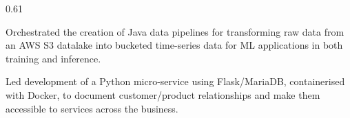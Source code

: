 \documentclass{CV}
\begin{document}
\begin{cvcolumn}{0.61\textwidth}
\vspace{4pt}

\par
{}
\begin{tightemize}
  \item Orchestrated the creation of Java data pipelines for transforming raw data from an AWS S3 datalake into bucketed
  time-series data for ML applications in both training and inference.
  \item Led development of a Python micro-service using Flask/MariaDB, containerised with Docker, to document customer/product
  relationships and make them accessible to services across the business.
\end{tightemize}

\end{cvcolumn}
\end{document}
